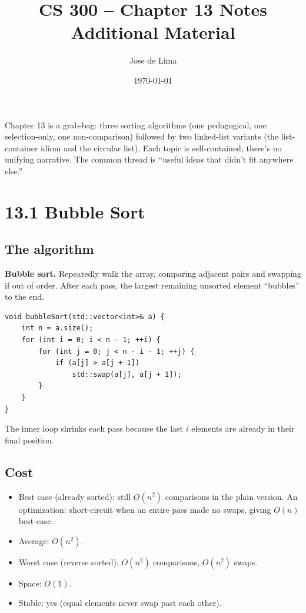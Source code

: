 \documentclass[11pt]{article}
\title{CS 300 -- Chapter 13 Notes\\\large Additional Material}
\author{Jose de Lima}
\date{\today}
\begin{document}
\maketitle

\begin{ideabox}
Chapter 13 is a grab-bag: three sorting algorithms (one pedagogical, one selection-only, one non-comparison) followed by two linked-list variants (the list-container idiom and the circular list). Each topic is self-contained; there's no unifying narrative. The common thread is ``useful ideas that didn't fit anywhere else.''
\end{ideabox}

\section{13.1 Bubble Sort}

\subsection*{The algorithm}

\begin{defnbox}
\textbf{Bubble sort.} Repeatedly walk the array, comparing adjacent pairs and swapping if out of order. After each pass, the largest remaining unsorted element ``bubbles'' to the end.
\end{defnbox}

\begin{lstlisting}[basicstyle=\ttfamily\small,frame=single]
void bubbleSort(std::vector<int>& a) {
    int n = a.size();
    for (int i = 0; i < n - 1; ++i) {
        for (int j = 0; j < n - i - 1; ++j) {
            if (a[j] > a[j + 1])
                std::swap(a[j], a[j + 1]);
        }
    }
}
\end{lstlisting}

The inner loop shrinks each pass because the last $i$ elements are already in their final position.

\subsection*{Cost}

\begin{itemize}[leftmargin=*]
    \item Best case (already sorted): still $O(n^2)$ comparisons in the plain version. An optimization: short-circuit when an entire pass made no swaps, giving $O(n)$ best case.
    \item Average: $O(n^2)$.
    \item Worst case (reverse sorted): $O(n^2)$ comparisons, $O(n^2)$ swaps.
    \item Space: $O(1)$.
    \item Stable: yes (equal elements never swap past each other).
\end{itemize}
\end{document}
